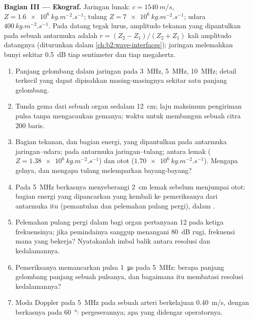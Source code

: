 \begin{problem}
\medskip
\noindent\textbf{Bagian III --- Ekograf.}
Jaringan lunak: $c = \qty{1540}{m/s}$, $Z = \qty{1.6e6}{kg.m^{-2}.s^{-1}}$; tulang
$Z = \qty{7e6}{kg.m^{-2}.s^{-1}}$; udara $\qty{400}{kg.m^{-2}.s^{-1}}$. Pada
datang tegak lurus, amplitudo tekanan yang dipantulkan pada sebuah antarmuka adalah $r = (Z_2 -
Z_1)/(Z_2 + Z_1)$ kali amplitudo datangnya (diturunkan dalam
\cref{ch:b2:wave-interfaces}); jaringan melemahkan bunyi sekitar
\qty{0.5}{dB} tiap sentimeter dan tiap megahertz.
\begin{enumerate}[resume]
  \item Panjang gelombang dalam jaringan pada \qty{3}{MHz}, \qty{5}{MHz}, \qty{10}{MHz};
        detail terkecil yang dapat dipisahkan masing-masingnya sekitar satu panjang gelombang.
  \item Tunda gema dari sebuah organ sedalam \qty{12}{cm}; laju maksimum pengiriman
        pulsa tanpa mengacaukan gemanya; waktu untuk membangun
        sebuah citra $200$ baris.
  \item Bagian tekanan, dan bagian energi, yang dipantulkan pada
        antarmuka jaringan--udara; pada antarmuka jaringan--tulang; antara lemak
        ($Z = \qty{1.38e6}{kg.m^{-2}.s^{-1}}$) dan otot
        ($\qty{1.70e6}{kg.m^{-2}.s^{-1}}$). Mengapa gelnya, dan mengapa tulang melemparkan
        bayang-bayang?
  \item Pada \qty{5}{MHz} berkasnya menyeberangi \qty{2}{cm} lemak sebelum menjumpai
        otot: bagian energi yang dipancarkan yang kembali ke
        pemeriksanya dari antarmuka itu (pemantulan dan pelemahan pulang
        pergi), dalam .
  \item Pelemahan pulang pergi dalam  bagi organ pertanyaan 12
        pada ketiga frekuensinya; jika pemindainya sanggup menangani
        \qty{80}{dB} rugi, frekuensi mana yang bekerja? Nyatakanlah imbal balik antara resolusi
        dan kedalamannya.
  \item Pemeriksanya memancarkan pulsa \qty{1}{\micro s} pada \qty{5}{MHz}: berapa
        panjang gelombang panjang sebuah pulsanya, dan bagaimana itu membatasi resolusi kedalamannya?
  \item Moda Doppler pada \qty{5}{MHz} pada sebuah arteri berkelajuan \qty{0.40}{m/s}, dengan berkasnya pada
        \qty{60}{\degree}: pergeserannya; apa yang didengar operatornya.
\end{enumerate}


\end{problem}
